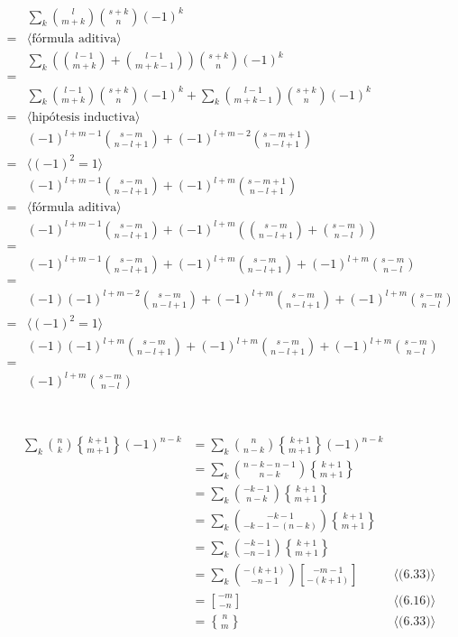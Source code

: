 \documentclass{article}
\newcommand{\stirlingU}[2]{\genfrac{[}{]}{0pt}{}{#1}{#2}}
\newcommand{\stirlingD}[2]{\genfrac{\{}{\}}{0pt}{}{#1}{#2}}
\begin{document}
\begin{align*}
  & \sum_k \binom{l}{m+k} \binom{s+k}{n} (-1)^k \\
  = & \langle \text{fórmula aditiva} \rangle \\
  & \sum_k \left(\binom{l-1}{m+k}+\binom{l-1}{m+k-1}\right) \binom{s+k}{n} (-1)^k \\
  = & \\
  & \sum_k \binom{l-1}{m+k} \binom{s+k}{n} (-1)^k + \sum_k \binom{l-1}{m+k-1} \binom{s+k}{n} (-1)^k \\
  = & \langle \text{hipótesis inductiva} \rangle \\
  & (-1)^{l+m-1} \binom{s-m}{n-l+1} + (-1)^{l+m-2} \binom{s-m+1}{n-l+1} \\
  = & \langle (-1)^2 = 1 \rangle \\
  & (-1)^{l+m-1} \binom{s-m}{n-l+1} + (-1)^{l+m} \binom{s-m+1}{n-l+1} \\
  = & \langle \text{fórmula aditiva} \rangle \\
  & (-1)^{l+m-1} \binom{s-m}{n-l+1} + (-1)^{l+m} \left( \binom{s-m}{n-l+1} + \binom{s-m}{n-l} \right) \\
  = & \\
  & (-1)^{l+m-1} \binom{s-m}{n-l+1} + (-1)^{l+m} \binom{s-m}{n-l+1} + (-1)^{l+m} \binom{s-m}{n-l} \\
  = & \\
  & (-1)(-1)^{l+m-2} \binom{s-m}{n-l+1} + (-1)^{l+m} \binom{s-m}{n-l+1} + (-1)^{l+m} \binom{s-m}{n-l} \\
  = & \langle (-1)^2 = 1 \rangle \\
  & (-1)(-1)^{l+m} \binom{s-m}{n-l+1} + (-1)^{l+m} \binom{s-m}{n-l+1} + (-1)^{l+m} \binom{s-m}{n-l} \\
  = & \\
  & (-1)^{l+m} \binom{s-m}{n-l} \\
\end{align*}

\newpage
\section{}

\begin{align*}
  \sum_k \binom{n}{k} \stirlingD{k+1}{m+1} (-1)^{n-k} & = \sum_k \binom{n}{n-k} \stirlingD{k+1}{m+1} (-1)^{n-k} \\
  & = \sum_k \binom{n-k-n-1}{n-k} \stirlingD{k+1}{m+1} \\
  & = \sum_k \binom{-k-1}{n-k} \stirlingD{k+1}{m+1} \\
  & = \sum_k \binom{-k-1}{-k-1-(n-k)} \stirlingD{k+1}{m+1} \\
  & = \sum_k \binom{-k-1}{-n-1} \stirlingD{k+1}{m+1} \\
  & = \sum_k \binom{-(k+1)}{-n-1} \stirlingU{-m-1}{-(k+1)} & \langle \text{(6.33)} \rangle \\
  & = \stirlingU{-m}{-n} & \langle \text{(6.16)} \rangle \\
  & = \stirlingD{n}{m} & \langle \text{(6.33)} \rangle \\
\end{align*}
\end{document}
